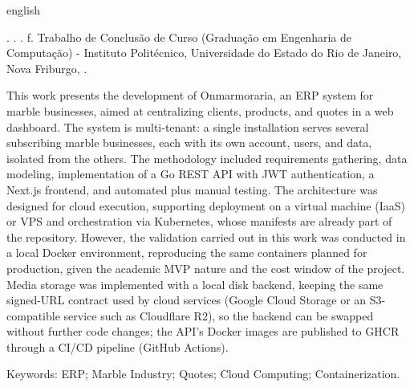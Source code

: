 
\begin{resumo}[Abstract]
\begin{otherlanguage*}{english}
\begin{SingleSpace}

\noindent
\begin{flushleft}
\entradaAutor{}. \textit{\englishTitle{}}. \the\year. \pageref{LastPage} f. Trabalho de Conclusão de Curso (Graduação em Engenharia de Computação) - Instituto Politécnico, Universidade do Estado do Rio de Janeiro, Nova Friburgo, \the\year.
\end{flushleft}
\vspace{\onelineskip}

\setlength{\parindent}{1.3cm}

This work presents the development of Onmarmoraria, an ERP system for marble businesses, aimed at centralizing clients, products, and quotes in a web dashboard. The system is multi-tenant: a single installation serves several subscribing marble businesses, each with its own account, users, and data, isolated from the others. The methodology included requirements gathering, data modeling, implementation of a Go REST API with JWT authentication, a Next.js frontend, and automated plus manual testing. The architecture was designed for cloud execution, supporting deployment on a virtual machine (IaaS) or VPS and orchestration via Kubernetes, whose manifests are already part of the repository. However, the validation carried out in this work was conducted in a local Docker environment, reproducing the same containers planned for production, given the academic MVP nature and the cost window of the project. Media storage was implemented with a local disk backend, keeping the same signed-URL contract used by cloud services (Google Cloud Storage or an S3-compatible service such as Cloudflare R2), so the backend can be swapped without further code changes; the API's Docker images are published to GHCR through a CI/CD pipeline (GitHub Actions).

\vspace{\onelineskip}
\noindent Keywords: ERP; Marble Industry; Quotes; Cloud Computing; Containerization.

\end{SingleSpace}
\end{otherlanguage*}
\end{resumo}